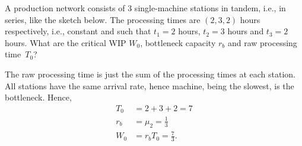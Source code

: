 \begin{exercise}
 A production network consists of 3 single-machine stations in
 tandem, i.e., in series, like the sketch below. The
 processing times are $(2, 3, 2)$ hours respectively, i.e., constant
 and such that $t_1=2$ hours, $t_2=3$ hours and $t_3=2$ hours.
What are the critical WIP $W_0$, bottleneck
 capacity $r_b$ and raw processing time~$T_0$?

 \centering

\begin{solution} 
 The raw processing time is just the sum of the processing times at
 each station. All stations have the same arrival rate, hence
 machine, being the slowest, is the bottleneck. Hence,
 \begin{align*}
 T_0 &= 2 + 3 + 2 = 7\\
 r_b &= \mu_2 = \frac13 \\
 W_0 &= r_b T_0 = \frac73.
 \end{align*}
\end{solution}
\end{exercise}

